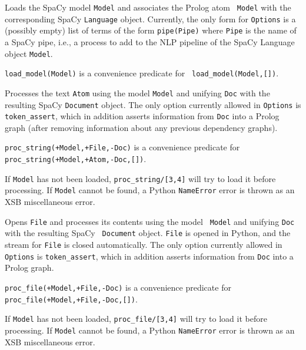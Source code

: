 \begin{description}
%  
Loads the SpaCy model {\tt Model} and associates the Prolog atom {\tt
  Model} with the corresponding SpaCy {\tt Language} object.
Currently, the only form for {\tt Options} is a (possibly empty) list
of terms of the form {\tt pipe(Pipe)} where {\tt Pipe} is the name of
a SpaCy pipe, i.e., a process to add to the NLP pipeline of the SpaCy
Language object {\tt Model}.

{\tt load\_model(Model)} is a convenience predicate for {\tt
  load\_model(Model,[])}.

%
Processes the text {\tt Atom} using the model {\tt Model} and unifying
{\tt Doc} with the resulting SpaCy {\tt Document} object.  The only
option currently allowed in {\tt Options} is {\tt
  token\_assert}, which in addition asserts information from {\tt Doc}
into a Prolog graph (after removing information about any previous
dependency graphs).

{\tt proc\_string(+Model,+File,-Doc)} is a convenience predicate for\\
{\tt proc\_string(+Model,+Atom,-Doc,[])}.

If {\tt Model} has not been loaded, {\tt proc\_string/[3,4]} will try
to load it before processing.  If {\tt Model} cannot be found, a
Python {\tt NameError} error is thrown as an XSB miscellaneous error.

%
Opens {\tt File} and processes its contents using the model {\tt
  Model} and unifying {\tt Doc} with the resulting SpaCy {\tt
  Document} object. {\tt File} is opened in Python, and the stream for
{\tt File} is closed automatically.  The only option currently allowed
in {\tt Options} is {\tt token\_assert}, which in addition asserts
information from {\tt Doc} into a Prolog graph.

{\tt proc\_file(+Model,+File,-Doc)} is a convenience predicate for\\
{\tt proc\_file(+Model,+File,-Doc,[])}.

If {\tt Model} has not been loaded, {\tt proc\_file/[3,4]} will try to
load it before processing.  If {\tt Model} cannot be found, a Python
{\tt NameError} error is thrown as an XSB miscellaneous error.


\end{description}
